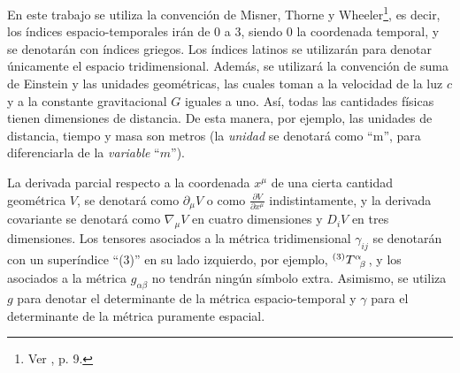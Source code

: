 \documentclass[11pt,twoside,openright,spanish]{report}
\numberwithin{equation}{chapter}
\numberwithin{figure}{chapter}
\numberwithin{table}{chapter}
\begin{document}
\begin{notation}
	\noindent
	En este trabajo se utiliza la convención de Misner, Thorne y Wheeler\footnote{Ver \citet{MTW}, p. 9.}, es decir, los índices espacio-temporales irán de 0 a 3, siendo 0 la coordenada temporal, y se denotarán con índices griegos. Los índices latinos se utilizarán para denotar únicamente el espacio tridimensional. Además, se utilizará la convención de suma de Einstein y las unidades geométricas, las cuales toman a la velocidad de la luz $c$ y a la constante gravitacional $G$ iguales a uno. Así, todas las cantidades físicas tienen dimensiones de distancia. De esta manera, por ejemplo, las unidades de distancia, tiempo y masa son metros (la \textit{unidad} se denotará como ``$\text{m}$'', para diferenciarla de la \textit{variable} ``$m$'').
	
	La derivada parcial respecto a la coordenada $x^\mu$ de una cierta cantidad geométrica $V$, se denotará como $\partial_\mu V$ o como $\frac{\partial V}{\partial x^\mu}$ indistintamente, y la derivada covariante se denotará como $\nabla_\mu V$ en cuatro dimensiones y $D_i V$ en tres dimensiones. Los tensores asociados a la métrica tridimensional $\gamma_{ij}$ se denotarán con un superíndice ``(3)'' en su lado izquierdo, por ejemplo, $^{(3)}\tensor{T}{^\alpha_\beta}$, y los asociados a la métrica $g_{\alpha\beta}$ no tendrán ningún símbolo extra. Asimismo, se utiliza $g$ para denotar el determinante de la métrica espacio-temporal y $\gamma$ para el determinante de la métrica puramente espacial.
\end{notation}
\end{document}
